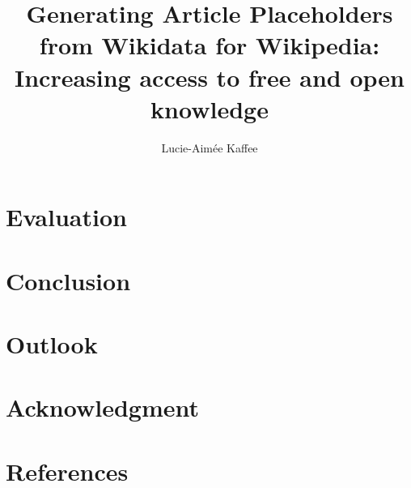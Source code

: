 \documentclass[11pt]{article}
\title{Generating Article Placeholders from Wikidata for Wikipedia:\\Increasing access to free and open knowledge}
\author{Lucie-Aim\'{e}e Kaffee}
\date{}
\begin{document}
\linenumbers
\maketitle
\newpage
\tableofcontents



\newpage

\newpage

\section{Evaluation} 
\section{Conclusion}
\section{Outlook}
\section{Acknowledgment}
\section{References}
\end{document}
